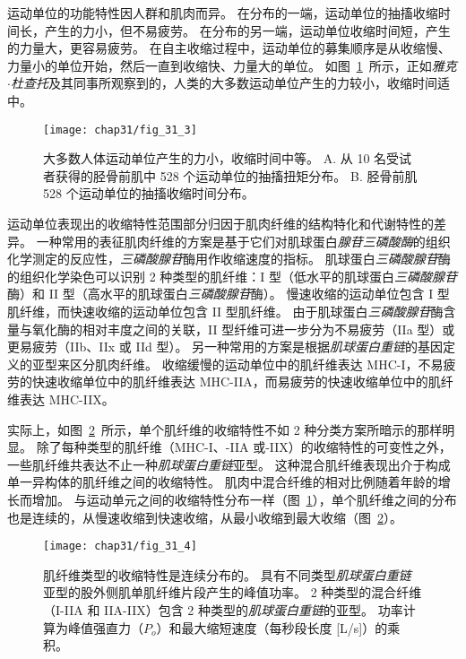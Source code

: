 运动单位的功能特性因人群和肌肉而异。
在分布的一端，运动单位的抽搐收缩时间长，产生的力小，但不易疲劳。
在分布的另一端，运动单位收缩时间短，产生的力量大，更容易疲劳。
在自主收缩过程中，运动单位的募集顺序是从收缩慢、力量小的单位开始，然后一直到收缩快、力量大的单位。 
如图~\ref{fig:31_3}~所示，正如\textit{雅克$\cdot$杜查托}及其同事所观察到的，人类的大多数运动单位产生的力较小，收缩时间适中。


\begin{figure}[htbp]
	\centering
	\texttt{[image: chap31/fig\_31\_3]}
	\caption{大多数人体运动单位产生的力小，收缩时间中等\cite{cutsem1997mechanical}。
	A. 从 10 名受试者获得的胫骨前肌中 528 个运动单位的抽搐扭矩分布。
	B. 胫骨前肌 528 个运动单位的抽搐收缩时间分布。}
	\label{fig:31_3}
\end{figure}


运动单位表现出的收缩特性范围部分归因于肌肉纤维的结构特化和代谢特性的差异。
一种常用的表征肌肉纤维的方案是基于它们对肌球蛋白\textit{腺苷三磷酸酶}的组织化学测定的反应性，\textit{三磷酸腺苷}酶用作收缩速度的指标。
肌球蛋白\textit{三磷酸腺苷}酶的组织化学染色可以识别 2 种类型的肌纤维：I 型（低水平的肌球蛋白\textit{三磷酸腺苷}酶）和 II 型（高水平的肌球蛋白\textit{三磷酸腺苷}酶）。
慢速收缩的运动单位包含 I 型肌纤维，而快速收缩的运动单位包含 II 型肌纤维。
由于肌球蛋白\textit{三磷酸腺苷}酶含量与氧化酶的相对丰度之间的关联，II 型纤维可进一步分为不易疲劳（IIa 型）或更易疲劳（IIb、IIx 或 IId 型）。
另一种常用的方案是根据\textit{肌球蛋白重链}的基因定义的亚型来区分肌肉纤维。
收缩缓慢的运动单位中的肌纤维表达 MHC-I，不易疲劳的快速收缩单位中的肌纤维表达 MHC-IIA，而易疲劳的快速收缩单位中的肌纤维表达 MHC-IIX。


实际上，如图~\ref{fig:31_4}~所示，单个肌纤维的收缩特性不如 2 种分类方案所暗示的那样明显。
除了每种类型的肌纤维（MHC-I、-IIA 或-IIX）的收缩特性的可变性之外，一些肌纤维共表达不止一种\textit{肌球蛋白重链}亚型。
这种混合肌纤维表现出介于构成单一异构体的肌纤维之间的收缩特性。
肌肉中混合纤维的相对比例随着年龄的增长而增加。
与运动单元之间的收缩特性分布一样（图~\ref{fig:31_3}），单个肌纤维之间的分布也是连续的，从慢速收缩到快速收缩，从最小收缩到最大收缩（图~\ref{fig:31_4}）。


\begin{figure}[htbp]
	\centering
	\texttt{[image: chap31/fig\_31\_4]}
	\caption{肌纤维类型的收缩特性是连续分布的。
	具有不同类型\textit{肌球蛋白重链}亚型的股外侧肌单肌纤维片段产生的峰值功率。
	2 种类型的混合纤维（I-IIA 和 IIA-IIX）包含 2 种类型的\textit{肌球蛋白重链}的亚型。
	功率计算为峰值强直力（$P_o$）和最大缩短速度（每秒段长度 [L/s]）的乘积\cite{bottinelli1996force}。}
	\label{fig:31_4}
\end{figure}



